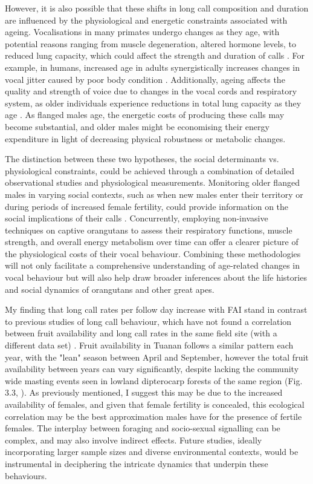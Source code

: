 However, it is also possible that these shifts in long call composition and duration are influenced by the physiological and energetic constraints associated with ageing. Vocalisations in many primates undergo changes as they age, with potential reasons ranging from muscle degeneration, altered hormone levels, to reduced lung capacity, which could affect the strength and duration of calls \citep{Ey.2007, Pistorio.2006, Inoue.1988}. For example, in humans, increased age in adults synergistically increases changes in vocal jitter caused by poor body condition \citep{Ramig.1983}. Additionally, ageing affects the quality and strength of voice due to changes in the vocal cords and respiratory system, as older individuals experience reductions in total lung capacity as they age \citep{Teramoto.1999}. As flanged males age, the energetic costs of producing these calls may become substantial, and older males might be economising their energy expenditure in light of decreasing physical robustness or metabolic changes.

The distinction between these two hypotheses, the social determinants vs. physiological constraints, could be achieved through a combination of detailed observational studies and physiological measurements. Monitoring older flanged males in varying social contexts, such as when new males enter their territory or during periods of increased female fertility, could provide information on the social implications of their calls \citep{Spillmann.2016, Hayward.2018}. Concurrently, employing non-invasive techniques on captive orangutans to assess their respiratory functions, muscle strength, and overall energy metabolism over time can offer a clearer picture of the physiological costs of their vocal behaviour. Combining these methodologies will not only facilitate a comprehensive understanding of age-related changes in vocal behaviour but will also help draw broader inferences about the life histories and social dynamics of orangutans and other great apes.

My finding that long call rates per follow day increase with FAI stand in contrast to previous studies of long call behaviour, which have not found a correlation between fruit availability and long call rates in the same field site (with a different data set) \citep{Spillmann.2016}. Fruit availability in Tuanan follows a similar pattern each year, with the "lean" season between April and September, however the total fruit availability between years can vary significantly, despite lacking the community wide masting events seen in lowland dipterocarp forests of the same region (Fig. 3.3, \citep{Harrison.2016}). As previously mentioned, I suggest this may be due to the increased availability of females, and given that female fertility is concealed, this ecological correlation may be the best approximation males have for the presence of fertile females. The interplay between foraging and socio-sexual signalling can be complex, and may also involve indirect effects. Future studies, ideally incorporating larger sample sizes and diverse environmental contexts, would be instrumental in deciphering the intricate dynamics that underpin these behaviours.

